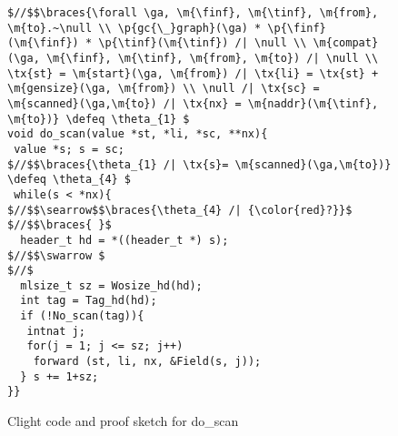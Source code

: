 \begin{figure}[t]
\vspace{-1ex}
  \begin{lstlisting}[multicols = 2]
$//$$\braces{\forall \ga, \m{\finf}, \m{\tinf}, \m{from}, \m{to}.~\null \\ \p{gc{\_}graph}(\ga) * \p{\finf}(\m{\finf}) * \p{\tinf}(\m{\tinf}) /| \null \\ \m{compat}(\ga, \m{\finf}, \m{\tinf}, \m{from}, \m{to}) /| \null \\ \tx{st} = \m{start}(\ga, \m{from}) /| \tx{li} = \tx{st} + \m{gensize}(\ga, \m{from}) \\ \null /| \tx{sc} = \m{scanned}(\ga,\m{to}) /| \tx{nx} = \m{naddr}(\m{\tinf}, \m{to})} \defeq \theta_{1} $
void do_scan(value *st, *li, *sc, **nx){
 value *s; s = sc;
$//$$\braces{\theta_{1} /| \tx{s}= \m{scanned}(\ga,\m{to})} \defeq \theta_{4} $
 while(s < *nx){
$//$$\searrow$$\braces{\theta_{4} /| {\color{red}?}}$
$//$$\braces{ }$
  header_t hd = *((header_t *) s);
$//$$\swarrow $
$//$
  mlsize_t sz = Wosize_hd(hd);
  int tag = Tag_hd(hd);
  if (!No_scan(tag)){
   intnat j;
   for(j = 1; j <= sz; j++)
    forward (st, li, nx, &Field(s, j)); 
  } s += 1+sz;
}} 
\end{lstlisting}

\vspace{-0.4em}
\caption{Clight code and proof sketch for do\_scan}
\label{fig:doscan}
\vspace{-1em}
\end{figure}
